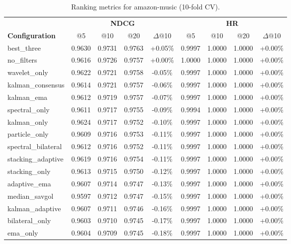 \begin{table}[htbp]
\centering
\caption{Ranking metrics for amazon-music (10-fold CV).}
\label{tab:ranking-amazon-music}
\begin{adjustbox}{max width=\textwidth}
\begin{tabular}{l cccc cccc}
\toprule
& \multicolumn{4}{c}{\textbf{NDCG}} & \multicolumn{4}{c}{\textbf{HR}} \\
\cmidrule(lr){2-5} \cmidrule(lr){6-9}
\textbf{Configuration} & @5 & @10 & @20 & $\Delta$@10 & @5 & @10 & @20 & $\Delta$@10 \\
\midrule
best\_three & 0.9630 & 0.9731 & 0.9763 & +0.05\% & 0.9997 & 1.0000 & 1.0000 & +0.00\% \\
no\_filters & 0.9616 & 0.9726 & 0.9757 & +0.00\% & 1.0000 & 1.0000 & 1.0000 & +0.00\% \\
wavelet\_only & 0.9622 & 0.9721 & 0.9758 & -0.05\% & 0.9997 & 1.0000 & 1.0000 & +0.00\% \\
kalman\_consensus & 0.9614 & 0.9721 & 0.9757 & -0.06\% & 0.9997 & 1.0000 & 1.0000 & +0.00\% \\
kalman\_ema & 0.9612 & 0.9719 & 0.9757 & -0.07\% & 0.9997 & 1.0000 & 1.0000 & +0.00\% \\
spectral\_only & 0.9611 & 0.9717 & 0.9755 & -0.09\% & 0.9994 & 1.0000 & 1.0000 & +0.00\% \\
kalman\_only & 0.9624 & 0.9717 & 0.9752 & -0.10\% & 0.9997 & 1.0000 & 1.0000 & +0.00\% \\
particle\_only & 0.9609 & 0.9716 & 0.9753 & -0.11\% & 0.9997 & 1.0000 & 1.0000 & +0.00\% \\
spectral\_bilateral & 0.9612 & 0.9716 & 0.9752 & -0.11\% & 0.9997 & 1.0000 & 1.0000 & +0.00\% \\
stacking\_adaptive & 0.9619 & 0.9716 & 0.9754 & -0.11\% & 0.9997 & 1.0000 & 1.0000 & +0.00\% \\
stacking\_only & 0.9613 & 0.9715 & 0.9750 & -0.12\% & 0.9997 & 1.0000 & 1.0000 & +0.00\% \\
adaptive\_ema & 0.9607 & 0.9714 & 0.9747 & -0.13\% & 0.9997 & 1.0000 & 1.0000 & +0.00\% \\
median\_savgol & 0.9597 & 0.9712 & 0.9747 & -0.15\% & 0.9997 & 1.0000 & 1.0000 & +0.00\% \\
kalman\_adaptive & 0.9607 & 0.9711 & 0.9746 & -0.16\% & 0.9997 & 1.0000 & 1.0000 & +0.00\% \\
bilateral\_only & 0.9603 & 0.9710 & 0.9745 & -0.17\% & 0.9997 & 1.0000 & 1.0000 & +0.00\% \\
ema\_only & 0.9604 & 0.9709 & 0.9745 & -0.18\% & 0.9997 & 1.0000 & 1.0000 & +0.00\% \\

\end{tabular}
\end{adjustbox}
\end{table}
